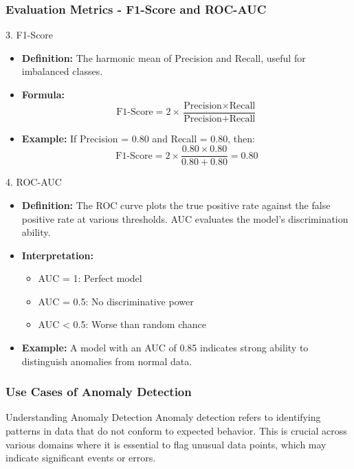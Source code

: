 \documentclass{beamer}
\begin{document}
\begin{frame}[fragile]
    \frametitle{Evaluation Metrics - F1-Score and ROC-AUC}
    \begin{block}{3. F1-Score}
        \begin{itemize}
            \item \textbf{Definition:} The harmonic mean of Precision and Recall, useful for imbalanced classes.
            \item \textbf{Formula:}  
            \[
            \text{F1-Score} = 2 \times \frac{\text{Precision} \times \text{Recall}}{\text{Precision} + \text{Recall}}
            \]
            \item \textbf{Example:} If Precision = 0.80 and Recall = 0.80, then:
            \[
            \text{F1-Score} = 2 \times \frac{0.80 \times 0.80}{0.80 + 0.80} = 0.80
            \]
        \end{itemize}
    \end{block}

    \begin{block}{4. ROC-AUC}
        \begin{itemize}
            \item \textbf{Definition:} The ROC curve plots the true positive rate against the false positive rate at various thresholds. AUC evaluates the model's discrimination ability.
            \item \textbf{Interpretation:}
            \begin{itemize}
                \item AUC = 1: Perfect model
                \item AUC = 0.5: No discriminative power
                \item AUC < 0.5: Worse than random chance
            \end{itemize}
            \item \textbf{Example:} A model with an AUC of 0.85 indicates strong ability to distinguish anomalies from normal data.
        \end{itemize}
    \end{block}
\end{frame}

\begin{frame}[fragile]
    \frametitle{Use Cases of Anomaly Detection}
    
    \begin{block}{Understanding Anomaly Detection}
        Anomaly detection refers to identifying patterns in data that do not conform to expected behavior. This is crucial across various domains where it is essential to flag unusual data points, which may indicate significant events or errors.
    \end{block}
\end{frame}
\end{document}
